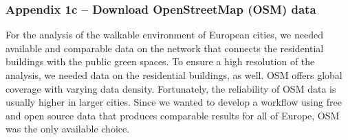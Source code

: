 \documentclass[10pt]{article}
\begin{document}
\begin{table}[]
\caption{Data overview table}
\label{tab:overview}
\end{table}

\subsubsection{Appendix 1c – Download OpenStreetMap (OSM) data}
For the analysis of the walkable environment of European cities, we needed available and comparable data on the network that connects the residential buildings with the public green spaces.
To ensure a high resolution of the analysis, we needed data on the residential buildings, as well.
OSM offers global coverage with varying data density. 
Fortunately, the reliability of OSM data is usually higher in larger cities.
Since we wanted to develop a workflow using free and open source data that produces comparable results for all of Europe, OSM was the only available choice.
\end{document}

